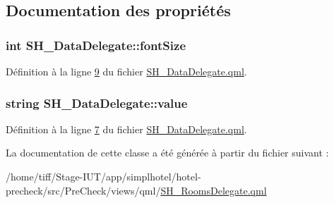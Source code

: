 \subsection{Documentation des propriétés}
\hypertarget{classSH__DataDelegate_afbb41ad9b513c7f27e7b5ad90d82e95b}{
\subsubsection[{font\-Size}]{\setlength{\rightskip}{0pt plus 5cm}int S\-H\-\_\-\-Data\-Delegate\-::font\-Size\hspace{0.3cm}{\ttfamily [inherited]}}}\label{classSH__DataDelegate_afbb41ad9b513c7f27e7b5ad90d82e95b}


Définition à la ligne \hyperlink{SH__DataDelegate_8qml_source_l00009}{9} du fichier \hyperlink{SH__DataDelegate_8qml_source}{S\-H\-\_\-\-Data\-Delegate.\-qml}.

\hypertarget{classSH__DataDelegate_acb9da3c73493c88865e08d9575f26482}{
\subsubsection[{value}]{\setlength{\rightskip}{0pt plus 5cm}string S\-H\-\_\-\-Data\-Delegate\-::value\hspace{0.3cm}{\ttfamily [inherited]}}}\label{classSH__DataDelegate_acb9da3c73493c88865e08d9575f26482}


Définition à la ligne \hyperlink{SH__DataDelegate_8qml_source_l00007}{7} du fichier \hyperlink{SH__DataDelegate_8qml_source}{S\-H\-\_\-\-Data\-Delegate.\-qml}.



La documentation de cette classe a été générée à partir du fichier suivant \-:\begin{DoxyCompactItemize}
\item 
/home/tiff/\-Stage-\/\-I\-U\-T/app/simplhotel/hotel-\/precheck/src/\-Pre\-Check/views/qml/\hyperlink{SH__RoomsDelegate_8qml}{S\-H\-\_\-\-Rooms\-Delegate.\-qml}\end{DoxyCompactItemize}

